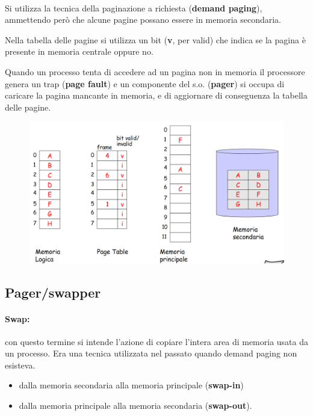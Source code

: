 \paragraph{}
Si utilizza la tecnica della paginazione a richiesta (\textbf{demand paging}), ammettendo però che alcune pagine possano essere in memoria secondaria.

Nella tabella delle pagine si utilizza un bit (\textbf{v}, per valid) che indica se la pagina è presente in memoria centrale oppure no.

Quando un processo tenta di accedere ad un pagina non in
memoria il processore genera un trap (\textbf{page fault}) e un componente del s.o. (\textbf{pager}) si occupa di caricare la pagina mancante in memoria, e di aggiornare di conseguenza la tabella delle pagine.

\begin{figure} [h]
    \centering
    \includegraphics[width=0.7\linewidth]{Images/Screenshot 2025-01-17 at 16-42-29 so-05-memoria - so-05-memoria.pdf.png}
\end{figure}

\subsection{Pager/swapper}

\paragraph{Swap:} con questo termine si intende l'azione di copiare l'intera area di memoria usata da un processo. Era una tecnica utilizzata nel passato quando demand paging non esisteva.
\begin{itemize}
    \item dalla memoria secondaria alla memoria principale (\textbf{swap-in})
    \item dalla memoria principale alla memoria secondaria (\textbf{swap-out}).
\end{itemize}

